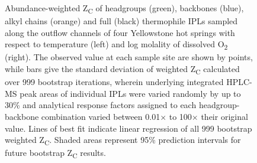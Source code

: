\begin{figure}[h]
\begin{subfigure}[b]{0.18\linewidth}
    \end{subfigure}
\caption[Abundance-weighted Z\textsubscript{C} of IPLs and their component parts]{Abundance-weighted Z\textsubscript{C} of headgroups (green), backbones (blue), alkyl chains (orange) and full (black) thermophile IPLs sampled along the outflow channels of four Yellowstone hot springs with respect to temperature (left) and log molality of dissolved O\textsubscript{2} (right). The observed value at each sample site are shown by points, while bars give the standard deviation of weighted Z\textsubscript{C} calculated over 999 bootstrap iterations, wherein underlying integrated HPLC-MS peak areas of individual IPLs were varied randomly by up to 30\% and analytical response factors assigned to each headgroup-backbone combination varied between 0.01$\times$ to 100$\times$ their original value. Lines of best fit indicate linear regression of all 999 bootstrap weighted Z\textsubscript{C}. Shaded areas represent 95\% prediction intervals for future bootstrap Z\textsubscript{C} results.}
\label{fig:weighted_ZC}
\end{figure}
\doublespace

